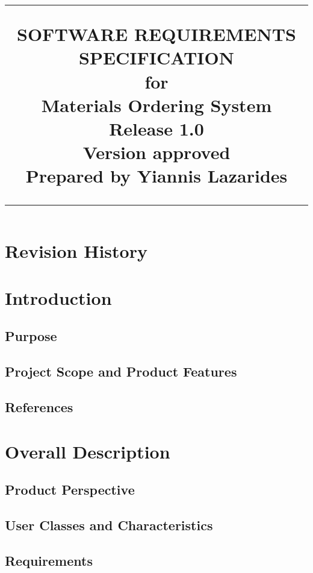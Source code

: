 \documentclass{scrreprt}
\title{%
\flushright
\rule{16cm}{5pt}\vskip1cm
\Huge{SOFTWARE REQUIREMENTS\\ SPECIFICATION}\\
\vspace{2cm}
for\\
\vspace{2cm}
Materials Ordering System\\
\vspace{2cm}
\LARGE{Release 1.0\\}
\vspace{2cm}
\LARGE{Version \myversion approved\\}
\vspace{2cm}
Prepared by Yiannis Lazarides\\
\vfill
\rule{16cm}{5pt}
}
\date{}
\begin{document}
\maketitle
\tableofcontents
\chapter*{Revision History}
\chapter{Introduction}
\section{Purpose}
\section{Project Scope and Product Features}
\section{References}
\chapter{Overall Description}
\section{Product Perspective}
\section{User Classes and Characteristics}
\section{Requirements}

\end{document}
